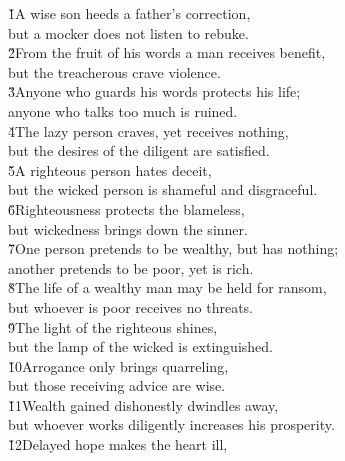 \begin{poetry}
\poeml {}
\v{1}A wise son heeds a father's correction, \\
\poeml but a mocker does not listen to rebuke. \\
\poeml \v{2}From the fruit of his words a man receives benefit, \\
\poemll    but the treacherous crave violence. \\
\poeml \v{3}Anyone who guards his words protects his life; \\
\poemll    anyone who talks too much is ruined. \\
\poeml \v{4}The lazy person craves, yet receives nothing, \\
\poemll    but the desires of the diligent are satisfied. \\
\poeml \v{5}A righteous person hates deceit, \\
\poemll    but the wicked person is shameful and disgraceful. \\
\poeml \v{6}Righteousness protects the blameless, \\
\poemll    but wickedness brings down the sinner. \\
\poeml \v{7}One person pretends to be wealthy, but has nothing; \\
\poemll    another pretends to be poor, yet is rich. \\
\poeml \v{8}The life of a wealthy man may be held for ransom, \\
\poemll    but whoever is poor receives no threats. \\
\poeml \v{9}The light of the righteous shines, \\
\poemll    but the lamp of the wicked is extinguished. \\
\poeml \v{10}Arrogance only brings quarreling, \\
\poemll    but those receiving advice are wise. \\
\poeml \v{11}Wealth gained dishonestly dwindles away, \\
\poemll    but whoever works diligently increases his prosperity. \\
\poeml \v{12}Delayed hope makes the heart ill, \\

\end{poetry}
